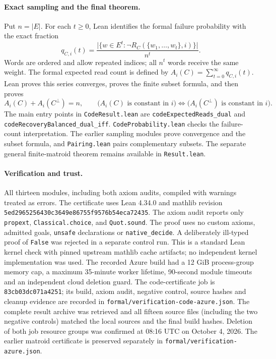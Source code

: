 \documentclass[11pt]{article}
\theoremstyle{remark}
\begin{document}
\paragraph{Exact sampling and the final theorem.}
Put $n=|E|$. For each $t\geq0$, Lean identifies the formal failure
probability with the exact fraction
\[
 q_{C,i}(t)=\frac{\bigl|\{w\in E^t:
           \neg R_C(\{w_1,\ldots,w_t\},i)\}\bigr|}{n^t}.
\]
Words are ordered and allow repeated indices; all $n^t$ words receive the
same weight. The formal expected read count is defined by
$A_i(C)=\sum_{t=0}^{\infty}q_{C,i}(t)$. Lean proves this series converges,
proves the finite subset formula, and then proves
\[
 A_i(C)+A_i(C^\perp)=n,
 \qquad
 \bigl(A_i(C)\text{ is constant in }i\bigr)
 \Longleftrightarrow
 \bigl(A_i(C^\perp)\text{ is constant in }i\bigr).
\]
The main entry points in \texttt{CodeResult.lean} are
\texttt{codeExpectedReads\_dual} and
\texttt{codeRecoveryBalanced\_dual\_iff}.
\texttt{CodeProbability.lean} checks the failure-count interpretation.
The earlier sampling modules prove convergence and the subset formula,
and \texttt{Pairing.lean} pairs complementary subsets.
The separate general finite-matroid theorem remains available in
\texttt{Result.lean}.

\paragraph{Verification and trust.}
All thirteen modules, including both axiom audits, compiled with warnings
treated as errors. The certificate uses Lean 4.34.0 and mathlib revision
\texttt{5ed2965256430c3649e86755f9576b54eca72435}.
The axiom audit reports only \texttt{propext}, \texttt{Classical.choice},
and \texttt{Quot.sound}. The proof uses no custom axioms, admitted goals,
\texttt{unsafe} declarations or \texttt{native\_decide}. A deliberately
ill-typed proof of \texttt{False} was rejected in a separate control run.
This is a standard Lean kernel check with pinned upstream mathlib cache
artifacts; no independent kernel implementation was used.
The recorded Azure build had a 12 GiB process-group memory cap,
a maximum 35-minute worker lifetime, 90-second module timeouts and an
independent cloud deletion guard. The code-certificate job is
\texttt{83cb03dc071a4251}; its build, axiom audit, negative control, source
hashes and cleanup evidence are recorded in
\texttt{formal/verification-code-azure.json}.
The complete result archive was retrieved and all fifteen source files
(including the two negative controls) matched the local sources and the
final build hashes. Deletion of both job resource groups was confirmed at
08:16 UTC on October 4, 2026.
The earlier matroid certificate is preserved separately in
\texttt{formal/verification-azure.json}.
\end{document}
